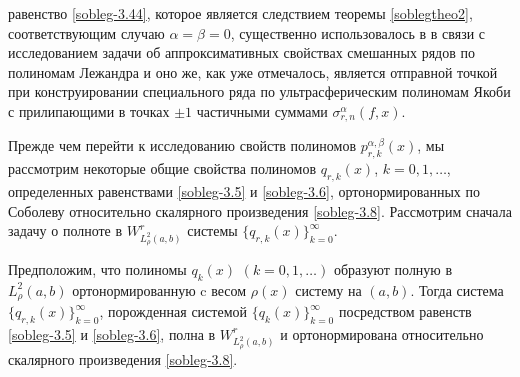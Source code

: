 равенство \eqref{sobleg-3.44}, которое является следствием теоремы \ref{soblegtheo2}, соответствующим случаю $\alpha=\beta=0$, существенно использовалось в \cite{sobleg-Shar15, sobleg-Shar16, sobleg-Shar17} в связи с исследованием задачи об аппроксимативных свойствах смешанных рядов по полиномам Лежандра и
оно же, как уже отмечалось,  является отправной точкой при конструировании специального ряда  по ультрасферическим полиномам Якоби с  прилипающими в точках $\pm1$ частичными суммами $\sigma_{r,n}^\alpha(f,x)$.

Прежде чем  перейти к исследованию свойств полиномов $p_{r,k}^{\alpha,\beta}(x)$, мы рассмотрим некоторые общие свойства  полиномов $q_{r,k}(x)$, $k=0,1,\ldots$, определенных равенствами \eqref{sobleg-3.5} и \eqref{sobleg-3.6},  ортонормированных по Соболеву относительно скалярного произведения \eqref{sobleg-3.8}. Рассмотрим сначала задачу о полноте в $W^r_{L^2_\rho(a,b)}$ системы $\{q_{r,k}(x)\}_{k=0}^\infty$.

\begin{theorem}\label{soblegstate1}
Предположим, что полиномы $q_k(x)$ $(k=0,1,\ldots)$ образуют полную в $L^2_\rho(a,b)$ ортонормированную   c весом   $\rho(x)$ систему на  $(a,b)$. Тогда система $\{q_{r,k}(x)\}_{k=0}^\infty$, порожденная системой $\{q_{k}(x)\}_{k=0}^\infty$ посредством равенств \eqref{sobleg-3.5} и \eqref{sobleg-3.6}, полна  в $W^r_{L^2_\rho(a,b)}$ и ортонормирована относительно скалярного произведения \eqref{sobleg-3.8}.
\end{theorem}

